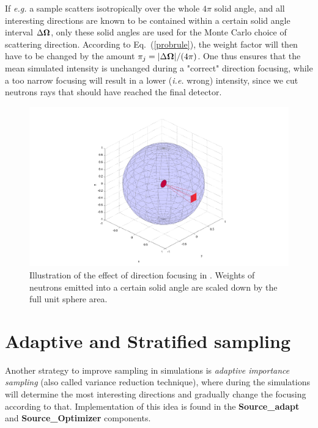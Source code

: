 If {\em e.g.} a sample scatters isotropically
over the whole $4\pi$ solid angle, and all interesting
directions are known to be contained within a certain
solid angle interval $\Delta \mbox{\boldmath $\Omega$}$, only these solid angles
are used for the Monte Carlo choice of scattering direction.
According to Eq.~(\ref{probrule}), the weight factor will then have
to be changed by the amount
$\pi_j = |\Delta \mbox{\boldmath $\Omega$}| / (4 \pi)$.
One thus ensures that the mean simulated intensity is unchanged
during a "correct" direction focusing, while a too narrow focusing will
result in a lower (\textit{i.e.} wrong) intensity, since
we cut neutrons rays that should have reached the final detector.

\begin{figure}[htb!]
\begin{center}
\includegraphics[width=.8\textwidth]{figures/focusing}
\end{center}
\caption{Illustration of the effect of direction focusing in \MCS
  . Weights of neutrons emitted into a certain solid angle are
  scaled down by the full unit sphere area.}
\label{fig:focusing}
\end{figure}

\section{Adaptive and Stratified sampling}
Another strategy to improve sampling in simulations
is \emph{adaptive importance sampling} (also called variance reduction technique), %
where \MCS during the simulations will determine
the most interesting directions and gradually change
the focusing according to that.
Implementation of this idea is
found in the {\bf Source\_adapt} and {\bf Source\_Optimizer} components.

